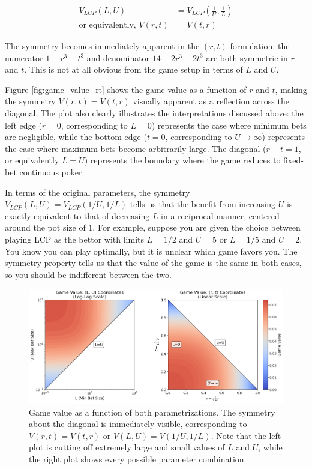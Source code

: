 \documentclass[../../main/main.tex]{subfiles}
\begin{document}
\begin{align*}
    V_{LCP}(L, U) &= V_{LCP}\left(\frac{1}{U}, \frac{1}{L}\right)\\
    \text{or equivalently, } V(r, t) &= V(t, r)
\end{align*}

The symmetry becomes immediately apparent in the $(r,t)$ formulation: the numerator $1 - r^3 - t^3$ and denominator $14 - 2r^3 - 2t^3$ are both symmetric in $r$ and $t$. This is not at all obvious from the game setup in terms of $L$ and $U$.

Figure \ref{fig:game_value_rt} shows the game value as a function of $r$ and $t$, making the symmetry $V(r,t) = V(t,r)$ visually apparent as a reflection across the diagonal. The plot also clearly illustrates the interpretations discussed above: the left edge ($r=0$, corresponding to $L=0$) represents the case where minimum bets are negligible, while the bottom edge ($t=0$, corresponding to $U \to \infty$) represents the case where maximum bets become arbitrarily large. The diagonal ($r+t=1$, or equivalently $L=U$) represents the boundary where the game reduces to fixed-bet continuous poker.

In terms of the original parameters, the symmetry $V_{LCP}(L, U) = V_{LCP}(1/U, 1/L)$ tells us that the benefit from increasing $U$ is exactly equivalent to that of decreasing $L$ in a reciprocal manner, centered around the pot size of $1$. For example, suppose you are given the choice between playing LCP as the bettor with limits $L=1/2$ and $U=5$ or $L=1/5$ and $U=2$. You know you can play optimally, but it is unclear which game favors you. The symmetry property tells us that the value of the game is the same in both cases, so you should be indifferent between the two.

\begin{figure}[h!]
    \centering
    \includegraphics[width=1.1\textwidth]{images/game_value_plots.png}
    \caption{Game value as a function of both parametrizations. The symmetry about the diagonal is immediately visible, corresponding to $V(r,t) = V(t,r)$ or $V(L, U) = V(1/U, 1/L)$. Note that the left plot is cutting off extremely large and small values of $L$ and $U$, while the right plot shows every possible parameter combination.}
    \label{fig:game_value_fig}
\end{figure}
\end{document}
